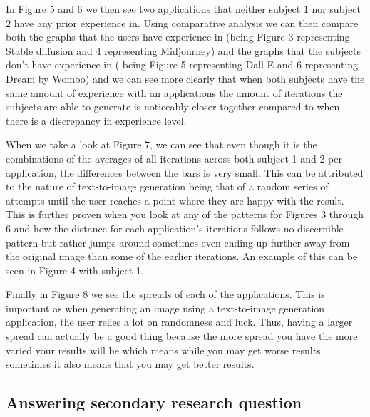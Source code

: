 \documentclass[]{report}
\begin{document}
	
	
	In Figure 5 and 6 we then see two applications that neither subject 1 nor subject 2 have any prior experience in. Using comparative analysis we can then compare both the graphs that the users have experience in (being Figure 3 representing Stable diffusion and 4 representing Midjourney) and the graphs that the subjects don't have experience in ( being Figure 5 representing Dall-E and 6 representing Dream by Wombo) and we can see more clearly that when both subjects have the same amount of experience with an applications the amount of iterations the subjects are able to generate is noticeably closer together compared to when there is a discrepancy in experience level. 
	
	
	
	When we take a look at Figure 7, we can see that even though it is the combinations of the averages of all iterations across both subject 1 and 2 per application, the differences between the bars is very small. This can be attributed to the nature of text-to-image generation being that of a random series of attempts until the user reaches a point where they are happy with the result. This is further proven when you look at any of the patterns for Figures 3 through 6 and how the distance for each application's iterations follows no discernible pattern but rather jumps around sometimes even ending up further away from the original image than some of the earlier iterations. An example of this can be seen in Figure 4 with subject 1.
	
	Finally in Figure 8 we see the spreads of each of the applications. This is important as when generating an image using a text-to-image generation application, the user relies a lot on randomness and luck. Thus, having a larger spread can actually be a good thing because the more spread you have the more varied your results will be which means while you may get worse results sometimes it also means that you may get better results.
	
	\subsection{Answering secondary research question}
	
\end{document}
